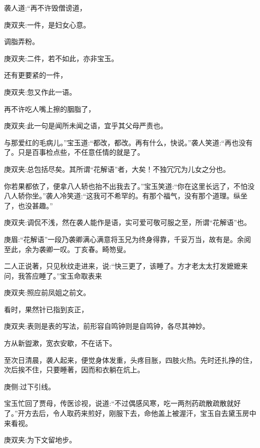 \begin{parag}
    袭人道:“再不许毁僧谤道，\begin{note}庚双夹:一件，是妇女心意。\end{note}调脂弄粉。\begin{note}庚双夹:二件，若不如此，亦非宝玉。\end{note}还有更要紧的一件，\begin{note}庚双夹:忽又作此一语。\end{note}再不许吃人嘴上擦的胭脂了，\begin{note}庚双夹:此一句是闻所未闻之语，宜乎其父母严责也。\end{note}与那爱红的毛病儿。”宝玉道:“都改，都改。再有什么，快说。”袭人笑道:“再也没有了。只是百事检点些，不任意任情的就是了。\begin{note}庚双夹:总包括尽矣。其所谓“花解语”者，大矣！不独冗冗为儿女之分也。\end{note}你若果都依了，便拿八人轿也抬不出我去了。”宝玉笑道:“你在这里长远了，不怕没八人轿你坐。”袭人冷笑道:“这我可不希罕的。有那个福气，没有那个道理。纵坐了，也没甚趣。”\begin{note}庚双夹:调侃不浅，然在袭人能作是语，实可爱可敬可服之至，所谓“花解语”也。\end{note}\begin{note}庚眉:“花解语”一段乃袭卿满心满意将玉兄为终身得靠，千妥万当，故有是。余阅至此，余为袭卿一叹。丁亥春。畸笏叟。\end{note}
\end{parag}


\begin{parag}
    二人正说著，只见秋纹走进来，说:“快三更了，该睡了。方才老太太打发嬷嬷来问，我答应睡了。”宝玉命取表来\begin{note}庚双夹:照应前凤姐之前文。\end{note}看时，果然针已指到亥正，\begin{note}庚双夹:表则是表的写法，前形容自鸣钟则是自鸣钟，各尽其神妙。\end{note}方从新盥漱，宽衣安歇，不在话下。
\end{parag}


\begin{parag}
    至次日清晨，袭人起来，便觉身体发重，头疼目胀，四肢火热。先时还扎挣的住，次后挨不住，只要睡著，因而和衣躺在炕上。\begin{note}庚侧:过下引线。\end{note}宝玉忙回了贾母，传医诊视，说道:“不过偶感风寒，吃一两剂药疏散疏散就好了。”开方去后，令人取药来煎好，刚服下去，命他盖上被渥汗，宝玉自去黛玉房中来看视。\begin{note}庚双夹:为下文留地步。\end{note}
\end{parag}


